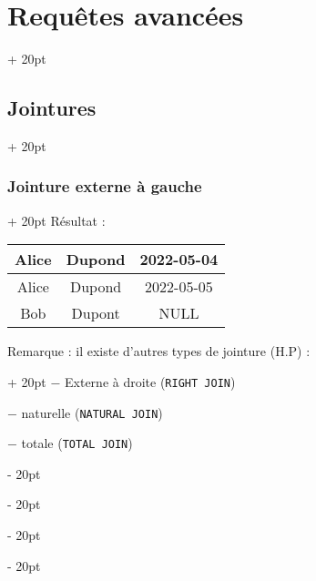 \documentclass[a4paper, 12pt, twoside]{article}
\newcommand{\ind}[1][20pt]{\advance\leftskip + #1}
\newcommand{\deind}[1][20pt]{\advance\leftskip - #1}
\newenvironment{indt}[2][20pt]{#2 \par \ind[#1]}{\par \deind} %
\begin{document}
\begin{indt}{\section{Requêtes avancées}}
\begin{indt}{\subsection{Jointures}}
\begin{indt}{\subsubsection{Jointure externe à gauche}}
                Résultat :
                \begin{tabular}{|c|c|c|}
                    \hline
                    Alice & Dupond & 2022-05-04
                    \\
                    \hline
                    Alice & Dupond & 2022-05-05
                    \\
                    \hline
                    Bob & Dupont & NULL
                    \\
                    \hline
                \end{tabular}

                \begin{indt}{Remarque : il existe d'autres types de jointure (H.P) :}
                    $-$ Externe à droite (\texttt{RIGHT JOIN})

                    $-$ naturelle (\texttt{NATURAL JOIN})

                    $-$ totale (\texttt{TOTAL JOIN})
                \end{indt}
            \end{indt}
        \end{indt}
    \end{indt}
    
    
    
\end{document}
